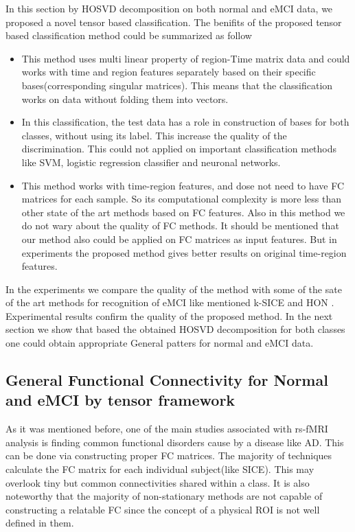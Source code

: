 \documentclass[journal]{IEEEtran}
\begin{document}
	
	In this section by HOSVD decomposition on both normal and eMCI data, we proposed a novel tensor based classification. The benifits of the proposed tensor based classification method could be summarized as follow
	\begin{itemize}
		\item This method  uses multi linear property of region-Time matrix data and  could works with time and region features separately based on their specific bases(corresponding singular matrices). This means that the classification works on data without folding them into vectors.
		\item  In this classification,  the test data has a role in construction of bases for both classes, without using its label. This  increase the quality of the discrimination. This could not applied on important classification methods like SVM, logistic regression classifier and neuronal networks. 
		\item This method works with time-region features, and dose not need to have FC matrices for each sample. So
		its computational complexity is more less than other state of the art methods  based on FC features. Also in this method we do not wary about the quality of FC methods.	
		It should be mentioned that our method also could be applied on FC matrices as input features. But in experiments the proposed method gives better results on original time-region features.  
	\end{itemize}
	In the experiments we compare the quality of the method with some of the sate of the art methods for recognition of eMCI like mentioned k-SICE and HON .
	Experimental results confirm the quality of the proposed method. In the next section we show that based the obtained HOSVD decomposition for both classes one could obtain appropriate General patters for normal and eMCI data.	
	\subsection{General Functional Connectivity for Normal and eMCI by tensor framework} \label{FC_Construction}
	
	
	As it was mentioned before, one of the main studies associated with rs-fMRI analysis is finding common functional disorders cause by a disease like AD. This can be done via constructing proper FC matrices. The majority of techniques calculate the FC matrix for each individual subject(like SICE). This may overlook tiny but common connectivities shared within a class. It is also noteworthy that the majority of non-stationary methods are not capable of constructing a relatable FC since the concept of a physical ROI is not well defined in them.    
	
\end{document}
